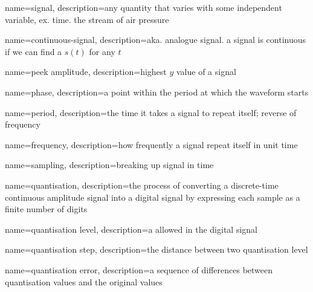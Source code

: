 {
  name=signal,
  description={any quantity that varies with some independent variable, ex. time.
  the stream of air pressure}
}

{
  name=continuous-signal,
  description={aka. analogue signal. a signal is continuous if we can find
  a $ s \left( t \right) $ for any $ t $}
}

{
  name=peek amplitude,
  description={highest $ y $ value of a signal}
}

{
  name=phase,
  description={a point within the period at which the waveform starts}
}

{
  name=period,
  description={the time it takes a signal to repeat itself; reverse of
  frequency}
}

{
  name=frequency,
  description={how frequently a signal repeat itself in unit time}
}

{
  name=sampling,
  description={breaking up signal in time}
}

{
  name=quantisation,
  description={the process of converting a discrete-time continuous amplitude
  signal into a digital signal by expressing each sample as a finite number
  of digits}
}

{
  name=quantisation level,
  description={a allowed in the digital signal}
}

{
  name=quantisation step,
  description={the distance between two quantisation level}
}

{
  name=quantisation error,
  description={a sequence of differences between quantisation values and the
  original values}
}
